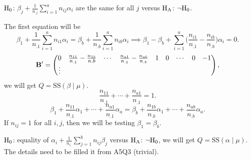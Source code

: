 $ \text{H}_0 $: $ \beta_j+\frac{1}{n_{.j}}\sum_{i=1}^a n_{ij}\alpha_i $
are the same for all $ j $ versus $ \text{H}_{\text{A}} $: $ \lnot\text{H}_0 $.

The first equation will be
\[ \beta_1+\frac{1}{n_{.1}}\sum_{i=1}^{a}n_{i1}\alpha_i=\beta_b
    +\frac{1}{n_{.b}}\sum_{i=1}^{a}n_{ib}\alpha_i
    \implies \beta_1-\beta_b+
    \sum_{i=1}^{a}\biggl(\frac{n_{i1}}{n_{.1}}-\frac{n_{ib}}{n_{.b}}\biggr)\alpha_i=0. \]
\[ \mathbf{B}'=\begin{pmatrix}
        0 & \frac{n_{11}}{n_{.1}}-\frac{n_{1b}}{n{.b}} & \cdots & \frac{n_{a1}}{n_{.1}}-\frac{n_{ab}}{n_{.b}} & 1 & 0 & \cdots & 0 & -1 \\
        \vdots
    \end{pmatrix}, \]
we will get $ Q=\text{SS}(\beta\mid \mu) $.
\[ \frac{n_{11}}{n_{.1}}+\cdots+\frac{n_{a1}}{n_{.1}}=1. \]
\[ \beta_1+\frac{n_{11}}{n_{.1}}\alpha_1+\cdots+\frac{n_{a1}}{n_{.1}}\alpha_a=
    \beta_b+\frac{n_{1b}}{n_{.b}}\alpha_1+\cdots+\frac{n_{ab}}{n_{.b}}\alpha_a. \]
If $ n_{ij}=1 $ for all $ i,j $, then we will be testing $ \beta_1=\beta_b $.

$ \text{H}_0 $: equality of $ \alpha_i+\frac{1}{n_{i.}}\sum_{j=1}^{b}n_{ij}\beta_j $
versus $ \text{H}_{\text{A}} $: $ \lnot \text{H}_0 $, we will get $ Q=\text{SS}(\alpha\mid \mu) $.
The details need to be filled it from A5Q3 (trivial)\@.
